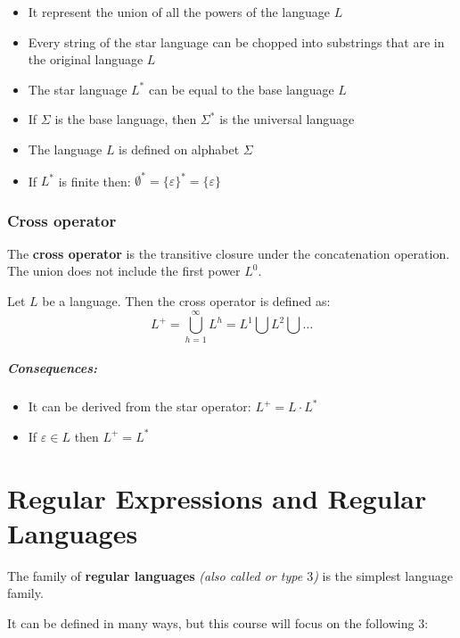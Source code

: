 \documentclass[english]{article}
\begin{document}
\begin{itemize}
  \item It represent the union of all the powers of the language \(L\)
  \item Every string of the star language can be chopped into substrings that are in the original language \(L\)
  \item The star language \(L^\ast\) can be equal to the base language \(L\)
  \item If \(\Sigma\) is the base language, then \(\Sigma^\ast\) is the universal language
  \item The language \(L\) is defined on alphabet \(\Sigma\)
  \item If \(L^\ast\) is finite then: \(\emptyset^\ast = \{\varepsilon\}^\ast = \{\varepsilon\}\)
\end{itemize}

\subsubsection{Cross operator}

The \textbf{cross operator} is the transitive closure under the concatenation operation.
The union does not include the first power \(L^0\).

\begin{definition}
  Let \(L\) be a language.
  Then the cross operator is defined as:
  \[ L^+ = \bigcup_{h=1}^{\infty} L^h = L^1 \bigcup L^2 \bigcup \ldots \]
\end{definition}

\subparagraph*{Consequences:}

\begin{itemize}
  \item It can be derived from the star operator: \(L^+ = L \cdot L^\ast\)
  \item If \(\varepsilon \in L\) then \(L^+ = L^\ast\)
\end{itemize}

\clearpage

\section{Regular Expressions and Regular Languages}

The family of \textbf{regular languages} \textit{(also called \REG or type \(3\))} is the simplest language family.

It can be defined in many ways, but this course will focus on the following \(3\):
\end{document}
